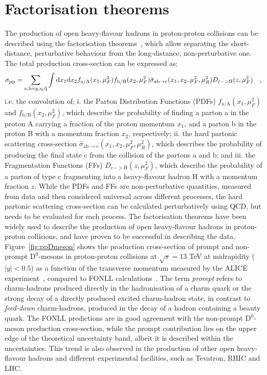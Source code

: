 \section{Factorisation theorems}
The production of open heavy-flavour hadrons in proton-proton collisions can be described using the factorisation theorems~\cite{Collins:1989gx}, which allow separating the short-distance, perturbative behaviour from the long-distance, non-perturbative one. The total production cross-section can be expressed as:
\begin{equation*}
    \sigma_{\text{pp}} = \sum_\mathrm{a,b = g, q, \overline{q}} \int \mathrm{d} x_1 \mathrm{d} x_2 f_\mathrm{a/A}(x_1,\mu_F^2) f_\mathrm{b/B}(x_2,\mu_F^2) \hat{\sigma}_\mathrm{ab \rightarrow c} (x_1,x_2,\mu_F^2,\mu_R^2) D_\mathrm{c->H}(z,\mu_F^2) \quad ,
\end{equation*}
i.e. the convolution of; i. the Parton Distribution Functions (PDFs) $f_\mathrm{a/A}(x_1,\mu_F^2)$ and $f_\mathrm{b/B}(x_2,\mu_F^2)$, which describe the probability of finding a parton a in the proton A carrying a fraction of the proton momentum $x_1$, and a parton b in the proton B with a momentum fraction $x_2$, respectively; ii. the hard partonic scattering cross-section $\hat{\sigma}_\mathrm{ab \rightarrow c} (x_1,x_2,\mu_F^2,\mu_R^2)$, which describes the probability of producing the final state c from the collision of the partons a and b; and iii. the Fragmentation Functions (FFs) $D_\mathrm{c->H}(z,\mu_F^2)$, which describe the probability of a parton of type c fragmenting into a heavy-flavour hadron H with a momentum fraction $z$. While the PDFs and FFs are non-perturbative quantities, measured from data and then considered universal across different processes, the hard partonic scattering cross-section can be calculated perturbatively using QCD, but needs to be evaluated for each process. The factorisation theorems have been widely used to describe the production of open heavy-flavour hadrons in proton-proton collisions, and have proven to be successful in describing the data. Figure~\ref{fig:ppDmeson} shows the production cross-section of prompt and non-prompt $\mathrm{D^0}$-mesons in proton-proton collisions at $\sqrt{s} = 13$ TeV at midrapidity ($\lvert y\rvert<0.5$) as a function of the transverse momentum \pt measured by the ALICE experiment~\cite{ALICE:2021mgk}, compared to FONLL calculations~\cite{Cacciari:2001td}. The term \emph{prompt} refers to charm-hadrons produced directly in the hadronisation of a charm quark or the strong decay of a directly produced excited charm-hadron state, in contrast to \emph{feed-down} charm-hadrons, produced in the decay of a hadron containing a beauty quark. The FONLL predictions are in good agreement with the non-prompt $\mathrm{D^0}$-meson production cross-section, while the prompt contribution lies on the upper edge of the theoretical uncertainty band, albeit it is described within the uncertainties. This trend is also observed in the production of other open heavy-flavour hadrons and different experimental facilities, such as Tevatron, RHIC and LHC.

